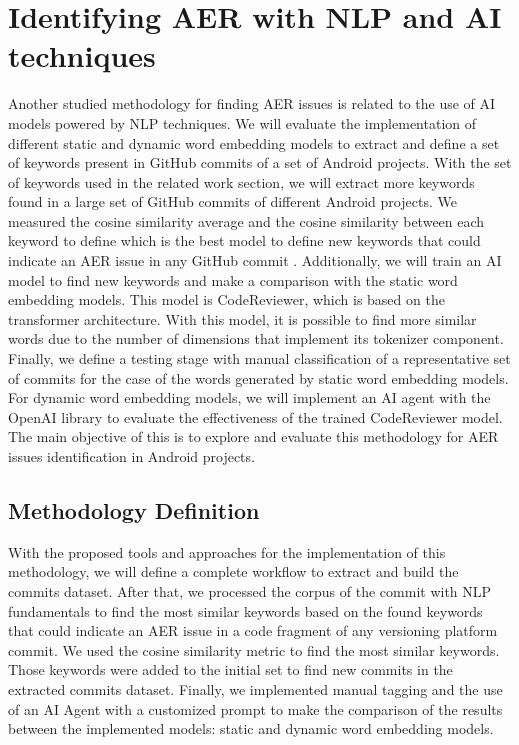 \chapter{Identifying AER with NLP and AI techniques}
\label{cha:nlp_and_ai}

Another studied methodology for finding AER issues is related to the use of AI models powered by NLP techniques. We will evaluate the implementation of different static and dynamic word embedding models to extract and define a set of keywords present in GitHub commits of a set of Android projects. With the set of keywords used in the related work section, we will extract more keywords found in a large set of GitHub commits of different Android projects. We measured the cosine similarity average and the cosine similarity between each keyword to define which is the best model to define new keywords that could indicate an AER issue in any GitHub commit \cite{codereviewer}. Additionally, we will train an AI model to find new keywords and make a comparison with the static word embedding models. This model is CodeReviewer, which is based on the transformer architecture. With this model, it is possible to find more similar words due to the number of dimensions that implement its tokenizer component. Finally,  we define a testing stage with manual classification of a representative set of commits for the case of the words generated by static word embedding models. For dynamic word embedding models, we will implement an AI agent with the OpenAI library to evaluate the effectiveness of the trained CodeReviewer model. The main objective of this is to explore and evaluate this methodology for AER issues identification in Android projects.

\section{Methodology Definition}
With the proposed tools and approaches for the implementation of this methodology, we will define a complete workflow to extract and build the commits dataset. After that, we processed the corpus of the commit with NLP fundamentals to find the most similar keywords based on the found keywords that could indicate an AER issue in a code fragment of any versioning platform commit. We used the cosine similarity metric to find the most similar keywords. Those keywords were added to the initial set to find new commits in the extracted commits dataset. Finally, we implemented manual tagging and the use of an AI Agent with a customized prompt to make the comparison of the results between the implemented models: static and dynamic word embedding models. 

